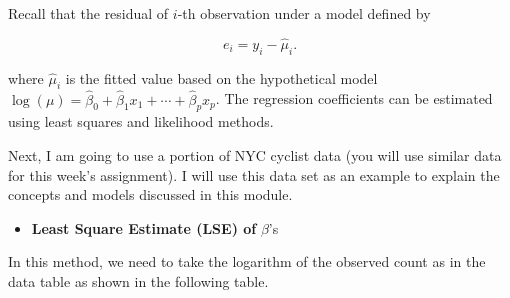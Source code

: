 \documentclass[
]{book}
\newenvironment{Shaded}{\begin{snugshade}}{\end{snugshade}}
\newcommand{\AttributeTok}[1]{\textcolor[rgb]{0.13,0.29,0.53}{#1}}
\newcommand{\FunctionTok}[1]{\textcolor[rgb]{0.13,0.29,0.53}{\textbf{#1}}}
\newcommand{\NormalTok}[1]{#1}
\newcommand{\OtherTok}[1]{\textcolor[rgb]{0.56,0.35,0.01}{#1}}
\newcommand{\SpecialCharTok}[1]{\textcolor[rgb]{0.81,0.36,0.00}{\textbf{#1}}}
\newcommand{\StringTok}[1]{\textcolor[rgb]{0.31,0.60,0.02}{#1}}
\providecommand{\tightlist}{%
  \setlength{\itemsep}{0pt}\setlength{\parskip}{0pt}}
\begin{document}
Recall that the residual of \(i\)-th observation under a model defined by

\[ e_i = y_i - \hat{\mu}_i.\]

where \(\hat{\mu}_i\) is the fitted value based on the hypothetical model \(\log(\mu) = \hat{\beta}_0 + \hat{\beta}_1x_1 + \cdots + \hat{\beta}_p x_p\). The regression coefficients can be estimated using least squares and likelihood methods.

Next, I am going to use a portion of NYC cyclist data (you will use similar data for this week's assignment). I will use this data set as an example to explain the concepts and models discussed in this module.

\begin{Shaded}
\end{Shaded}

\begin{itemize}
\tightlist
\item
  \textbf{Least Square Estimate (LSE) of} \(\beta\)'s
\end{itemize}

In this method, we need to take the logarithm of the observed count as in the data table as shown in the following table.
\end{document}
